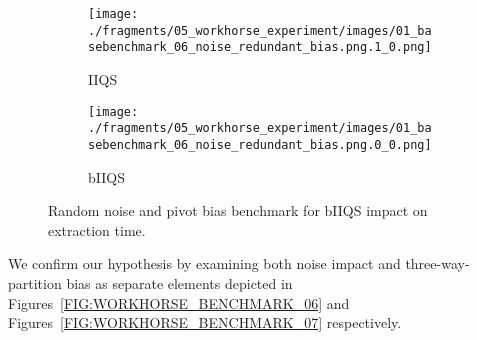 \begin{figure}
    \centering
    \begin{subfigure}[b]{0.45\textwidth}
        \centering
        \texttt{[image: ./fragments/05\_workhorse\_experiment/images/01\_basebenchmark\_06\_noise\_redundant\_bias.png.1\_0.png]}
        \caption{IIQS}
        \label{FIG:WORKHORSE_BENCHMARK_05__0_0}
    \end{subfigure}
    \hfill
    \begin{subfigure}[b]{0.45\textwidth}
        \centering
        \texttt{[image: ./fragments/05\_workhorse\_experiment/images/01\_basebenchmark\_06\_noise\_redundant\_bias.png.0\_0.png]}
        \caption{bIIQS}
        \label{FIG:WORKHORSE_BENCHMARK_05__0_1}
    \end{subfigure}

    \caption{Random noise and pivot bias benchmark for bIIQS impact on extraction time.}
    \label{FIG:WORKHORSE_BENCHMARK_05}
\end{figure}

We confirm our hypothesis by examining both noise impact and three-way-partition bias as separate elements depicted in Figures~\ref{FIG:WORKHORSE_BENCHMARK_06} and Figures~\ref{FIG:WORKHORSE_BENCHMARK_07} respectively.\\



